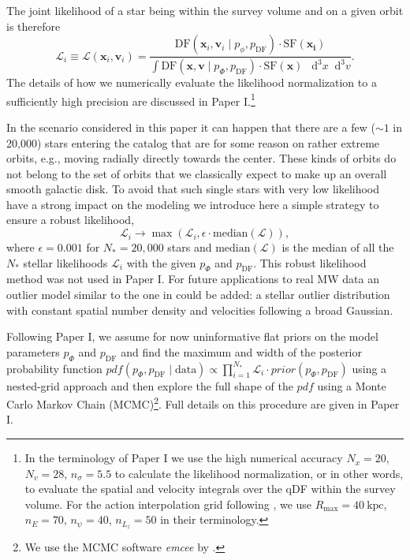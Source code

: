 \documentclass[iop,revtex4,numberedappendix,appendixfloats]{emulateapj}
\newcommand{\vect}[1]{\boldsymbol{#1}}
\newcommand*\Diff[1]{\mathop{}\!\mathrm{d^#1}}
\newcommand{\pdf}{\ensuremath{pdf}}
\begin{document}
The joint likelihood of a star being within the survey volume and on a given orbit is therefore
\begin{equation}
\mathscr{L}_i \equiv \mathscr{L}(\vect{x}_i,\vect{v}_i) = \frac{\text{DF}(\vect{x}_i,\vect{v}_i\mid p_\phi, p_\text{DF}) \cdot \text{SF}(\vect{x_i})}{\int \text{DF}(\vect{x},\vect{v}\mid p_\Phi, p_\text{DF}) \cdot \text{SF}(\vect{x}) \ \Diff3 x \Diff3 v}.
\end{equation}
The details of how we numerically evaluate the likelihood normalization to a sufficiently high precision are discussed in Paper I.\footnote{In the terminology of Paper I we use the high numerical accuracy $N_x = 20$, $N_v = 28$, $n_\sigma = 5.5$ to calculate the likelihood normalization, or in other words, to evaluate the spatial and velocity integrals over the qDF within the survey volume. For the action interpolation grid following \citet{2015ApJS..216...29B}, we use $R_\text{max}=40~\text{kpc}$, $n_E=70$, $n_\psi=40$, $n_{L_z}=50$ in their terminology.}

In the scenario considered in this paper it can happen that there are a few ($\sim 1$ in 20,000) stars entering the catalog that are for some reason  on rather extreme orbits, e.g., moving radially directly towards the center. These kinds of orbits do not belong to the set of orbits that we classically expect to make up an overall smooth galactic disk. To avoid that such single stars with very low likelihood have a strong impact on the modeling we introduce here a simple strategy to ensure a robust likelihood,
\begin{equation}
\mathscr{L}_i \longrightarrow \max \left( \mathscr{L}_i, \epsilon \cdot \text{median}(\mathscr{L})\right),
\end{equation}
where $\epsilon = 0.001$ for $N_*=20,000$ stars and $\text{median}(\mathscr{L})$ is the median of all the $N_*$ stellar likelihoods $\mathscr{L}_i$ with the given $p_\Phi$ and $p_\text{DF}$. This robust likelihood method was not used in Paper I. For future applications to real MW data an outlier model similar to the one in \citet{2013ApJ...773...43B} could be added: a stellar outlier distribution with constant spatial number density and velocities following a broad Gaussian.

Following Paper I, we assume for now uninformative flat priors on the model parameters $p_\Phi$ and $p_\text{DF}$ and find the maximum and width of the posterior probability function $pdf(p_\Phi,p_\text{DF} \mid \text{data}) \propto \prod_{i=1}^{N_*} \mathscr{L}_i \cdot prior(p_\Phi,p_\text{DF})$ using a nested-grid approach and then explore the full shape of the $\pdf$ using a Monte Carlo Markov Chain (MCMC)\footnote{We use the MCMC software \emph{emcee} by \citet{2013PASP..125..306F}.}. Full details on this procedure are given in Paper I.
\end{document}
